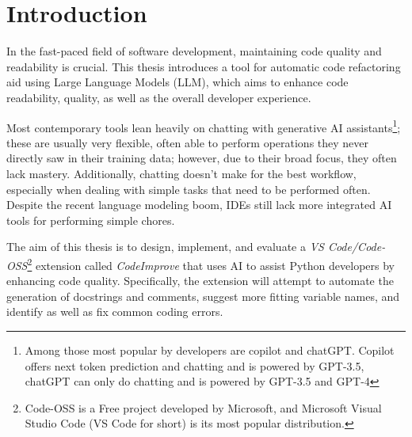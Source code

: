 
% 


\chapter{Introduction}

In the fast-paced field of software development, maintaining code quality and readability is crucial. This thesis introduces a tool for automatic code refactoring aid using Large Language Models (LLM), which aims to enhance code readability, quality, as well as the overall developer experience.  

Most contemporary tools lean heavily on chatting with generative AI assistants\footnote{Among those most popular by developers are copilot and chatGPT. Copilot offers next token prediction and chatting and is powered by GPT-3.5, chatGPT can only do chatting and is powered by GPT-3.5 and GPT-4}; these are usually very flexible, often able to perform operations they never directly saw in their training data; however, due to their broad focus, they often lack mastery.  Additionally, chatting doesn't make for the best workflow, especially when dealing with simple tasks that need to be performed often. Despite the recent language modeling boom, IDEs still lack more integrated AI tools for performing simple chores.

The aim of this thesis is to design, implement, and evaluate a \emph{VS Code/Code-OSS}\footnote{Code-OSS is a Free project developed by Microsoft, and Microsoft Visual Studio Code (VS Code for short) is its most popular distribution.} extension called \emph{CodeImprove} that uses AI to assist Python developers by enhancing code quality. Specifically, the extension will attempt to automate the generation of docstrings and comments, suggest more fitting variable names, and identify as well as fix common coding errors. 

